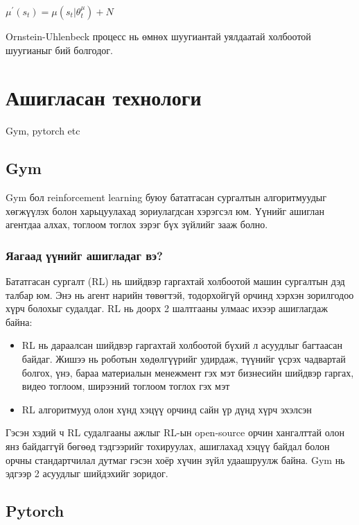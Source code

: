 \documentclass[12pt,A4]{report}
\begin{document}
\begin{center}
$\mu^{'}(s_t) = \mu(s_t|\theta_t^\mu) + N$
\end{center}

Ornstein-Uhlenbeck процесс нь өмнөх шуугиантай уялдаатай холбоотой шуугианыг бий болгодог.
 
\section{Ашигласан технологи}

Gym, pytorch etc

\subsection{Gym}

Gym бол reinforcement learning буюу бататгасан сургалтын алгоритмуудыг хөгжүүлэх болон харьцуулахад зориулагдсан хэрэгсэл юм. Үүнийг ашиглан агентдаа алхах, тоглоом тоглох зэрэг бүх зүйлийг зааж болно. 

\subsubsection{Яагаад үүнийг ашигладаг вэ?}

Бататгасан сургалт (RL) нь шийдвэр гаргахтай холбоотой машин сургалтын дэд талбар юм. Энэ нь агент нарийн төвөгтэй, тодорхойгүй орчинд хэрхэн зорилгодоо хүрч болохыг судалдаг. RL нь доорх 2 шалтгааны улмаас ихээр ашиглагдаж байна:

\begin{itemize}
	\item RL нь дараалсан шийдвэр гаргахтай холбоотой бүхий л асуудлыг багтаасан байдаг. Жишээ нь роботын хөдөлгүүрийг удирдаж, түүнийг үсрэх чадвартай болгох, үнэ, бараа материалын менежмент гэх мэт бизнесийн шийдвэр гаргах, видео тоглоом, ширээний тоглоом тоглох гэх мэт
	\item RL алгоритмууд олон хүнд хэцүү орчинд сайн үр дүнд хүрч эхэлсэн
\end{itemize} 

Гэсэн хэдий ч RL судалгааны ажлыг RL-ын open-source орчин хангалттай олон янз байдаггүй бөгөөд тэдгээрийг тохируулах, ашиглахад хэцүү байдал болон орчны стандартчилал дутмаг гэсэн хоёр хүчин зүйл удаашруулж байна. Gym нь эдгээр 2 асуудлыг шийдэхийг зоридог.

\subsection{Pytorch}
\end{document}
